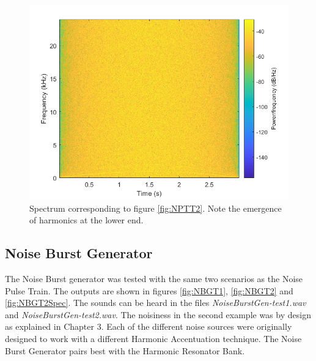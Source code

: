 \documentclass[../main.tex]{subfiles}
\begin{document}
\begin{figure}[h]
    \centering
    \includegraphics[scale=.65]{./images/plots/NPTTest2Spectrum.png}
    \caption{Spectrum corresponding to figure \ref{fig:NPTT2}. Note the emergence of harmonics at the lower end.}
    \label{fig:NPTT2Spec}
\end{figure}

\clearpage

\subsection{Noise Burst Generator}
The Noise Burst generator was tested with the same two scenarios as the Noise Pulse Train. The outputs are shown in figures \ref{fig:NBGT1}, \ref{fig:NBGT2} and \ref{fig:NBGT2Spec}. The sounds can be heard in the files \emph{NoiseBurstGen-test1.wav} and \emph{NoiseBurstGen-test2.wav}. The noisiness in the second example was by design as explained in Chapter 3. Each of the different noise sources were originally designed to work with a different Harmonic Accentuation technique. The Noise Burst Generator pairs best with the Harmonic Resonator Bank.
\end{document}
